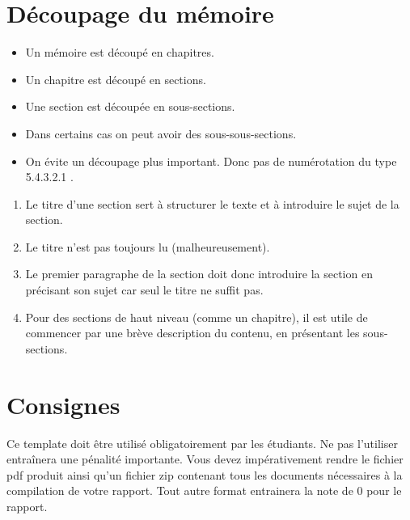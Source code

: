 \documentclass[a4paper, 12pt, twoside]{report}
\begin{document}
\chapter{Découpage du mémoire}
      \begin{itemize}
                \item Un mémoire est découpé en chapitres.
                \item Un chapitre est découpé en sections.
                \item Une section est découpée en sous-sections.
                \item Dans certains cas on peut avoir des sous-sous-sections.
                \item On évite un découpage plus important. Donc pas de numérotation du type 5.4.3.2.1 .
            \end{itemize}

\begin{enumerate}
            \item Le titre d'une section sert à structurer le texte et à introduire le sujet de la section.
            \item Le titre n'est pas toujours lu (malheureusement).
            \item Le premier paragraphe de la section doit donc introduire la section en précisant son sujet car seul le titre ne suffit pas.
            \item Pour des sections de haut niveau (comme un chapitre), il est utile de commencer par une brève description du contenu, en présentant les sous-sections. 
\end{enumerate}


\chapter{Consignes}
Ce template doit être utilisé obligatoirement par les étudiants. Ne pas l'utiliser entraînera une pénalité importante. Vous devez impérativement rendre le fichier pdf produit ainsi qu'un fichier zip contenant tous les documents nécessaires à la compilation de votre rapport. Tout autre format entrainera la note de $0$ pour le rapport.\\
\end{document}
